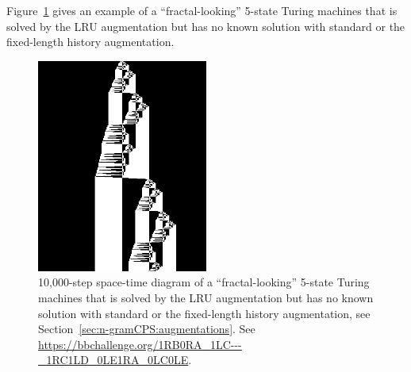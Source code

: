 Figure~\ref{fig:ngram-cps-more} gives an example of a ``fractal-looking'' 5-state Turing machines that is solved by the LRU augmentation but has no known solution with standard \ngramcps or the fixed-length history augmentation.

\begin{figure}
    \centering
    \includegraphics[width=0.5\textwidth]{figures/space-time-diagrams/ngramcps_LRU_35409542.png}

    \caption{10,000-step space-time diagram of a ``fractal-looking'' 5-state Turing machines that is solved by the LRU augmentation but has no known solution with standard \ngramcps or the fixed-length history augmentation, see Section~\ref{sec:n-gramCPS:augmentations}. See \url{https://bbchallenge.org/1RB0RA_1LC---_1RC1LD_0LE1RA_0LC0LE}.}\label{fig:ngram-cps-more}
\end{figure}




\newcommand{\leftngram}{left\xspace}
\newcommand{\rightngram}{right\xspace}
\newcommand{\middlesymbol}{middle\xspace}

